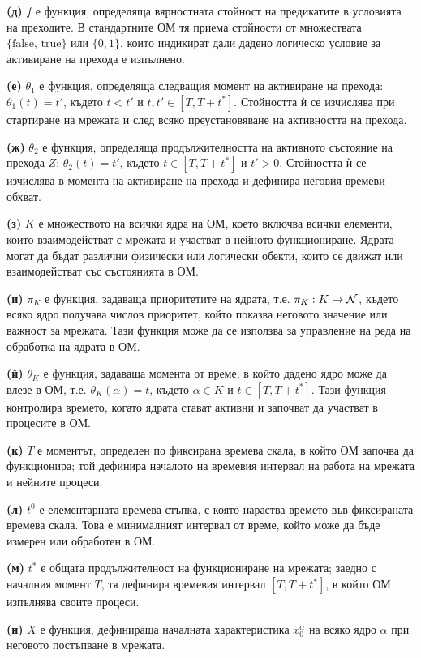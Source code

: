 {\bf (д)} $f$ е функция, определяща вярностната стойност на предикатите в условията на преходите. В стандартните ОМ тя приема стойности от множествата $\{ \text{false, true} \}$ или $\{ 0, 1 \}$, които индикират дали дадено логическо условие за активиране на прехода е изпълнено.

{\bf (е)} $\theta_{1}$ е функция, определяща следващия момент на активиране на прехода: $\theta_{1}(t) = t'$, където $t < t'$ и $t, t' \in [T, T + t^{*}]$. Стойността ѝ се изчислява при стартиране на мрежата и след всяко преустановяване на активността на прехода.

{\bf (ж)} $\theta_{2}$ е функция, определяща продължителността на активното състояние на прехода $Z$: $\theta_{2}(t) = t'$, където $t \in [T, T + t^{*}]$ и $t' > 0$. Стойността ѝ се изчислява в момента на активиране на прехода и дефинира неговия времеви обхват.

{\bf (з)}  $K$ е множеството на всички ядра на ОМ, което включва всички елементи, които взаимодействат с мрежата и участват в нейното функциониране. Ядрата могат да бъдат различни физически или логически обекти, които се движат или взаимодействат със състоянията в ОМ.

{\bf (и)}  $\pi_{K}$ е функция, задаваща приоритетите на ядрата, т.е. $\pi_{K}: K \rightarrow {\cal N}$, където всяко ядро получава числов приоритет, който показва неговото значение или важност за мрежата. Тази функция може да се използва за управление на реда на обработка на ядрата в ОМ.

{\bf (й)}  $\theta_{K}$ е функция, задаваща момента от време, в който дадено ядро може да влезе в ОМ, т.е. $\theta_{K}(\alpha) = t$, където $\alpha \in K$ и $t \in [T, T + t^{*}]$. Тази функция контролира времето, когато ядрата стават активни и започват да участват в процесите в ОМ.

{\bf (к)} $T$ е моментът, определен по фиксирана времева скала, в който ОМ започва да функционира; той дефинира началото на времевия интервал на работа на мрежата и нейните процеси.

{\bf (л)}  $t^{0}$ е елементарната времева стъпка, с която нараства времето във фиксираната времева скала. Това е минималният интервал от време, който може да бъде измерен или обработен в ОМ.

{\bf (м)} $t^{*}$ е общата продължителност на функциониране на мрежата; заедно с началния момент $T$, тя дефинира времевия интервал $[T, T + t^{*}]$, в който ОМ изпълнява своите процеси.

{\bf (н)} $X$ е функция, дефинираща началната характеристика $x^{\alpha}_{0}$ на всяко ядро $\alpha$ при неговото постъпване в мрежата.

